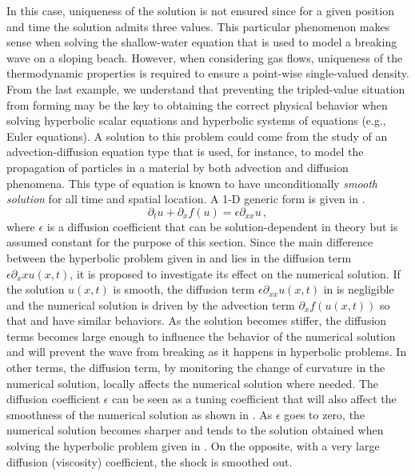 %
In this case, uniqueness of the solution is not ensured since for a given position and time the solution admits three values. This particular phenomenon makes sense when solving the shallow-water equation that is used to model a breaking wave on a sloping beach. However, when considering gas flows, uniqueness of the thermodynamic properties is required to ensure a point-wise single-valued density. From the last example, we understand that preventing the tripled-value situation from forming may be the key to obtaining the correct physical behavior when solving hyperbolic scalar equations and hyperbolic systems of equations (e.g., Euler equations). A solution to this problem could come from the study of an advection-diffusion equation type that is used, for instance, to model the propagation of particles in a material by both advection and diffusion phenomena. This type of equation is known to have unconditionally \emph{smooth solution} for all time and spatial location. A 1-D generic form is given in .
%
\begin{equation}\label{eq:adv_diff_sct1b}
\partial_t u + \partial_x f(u) = \epsilon \partial_{xx} u \,,
\end{equation}
% 
where $\epsilon$ is a diffusion coefficient that can be solution-dependent in theory but is assumed constant for the purpose of this section. Since the main difference between the hyperbolic problem given in  and  lies in the diffusion term $\epsilon \partial_xx u(x,t)$, it is proposed to investigate its effect on the numerical solution. If the solution $u(x,t)$ is smooth, the diffusion term $\epsilon \partial_{xx} u(x,t)$ in  is negligible and the numerical solution is driven by the advection term $\partial_x f(u(x,t))$ so that  and  have similar behaviors. As the solution becomes stiffer, the diffusion terms becomes large enough to influence the behavior of the numerical solution and will prevent the wave from breaking as it happens in hyperbolic problems. In other terms, the diffusion term, by monitoring the change of curvature in the numerical solution, locally affects the numerical solution where needed. The diffusion coefficient $\epsilon$ can be seen as a tuning coefficient that will also affect the smoothness of the numerical solution as shown in . As $\epsilon$ goes to zero, the numerical solution becomes sharper and tends to the solution obtained when solving the hyperbolic problem given in . On the opposite, with a very large diffusion (viscosity) coefficient, the shock is smoothed out.
